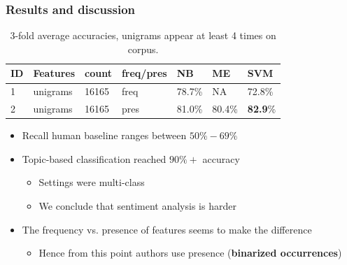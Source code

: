\documentclass{beamer}
\begin{document}
\begin{frame}
	\frametitle{Results and discussion}
	\begin{center}
		\begin{table}
			\begin{tabular}{l | l | l | l || l | l | l}
				ID & Features & count & freq/pres & NB & ME & SVM \\ \hline \hline
				1 & unigrams & 16165 & freq & 78.7\% & NA & 72.8\% \\
				2 & unigrams & 16165 & pres & 81.0\% & 80.4\% & \textbf{82.9}\% \\
			\end{tabular}
			\caption{3-fold average accuracies, unigrams appear at least 4 times on corpus.}
		\end{table}
	\end{center}
	\pause
	\begin{itemize}
		\item Recall human baseline ranges between $50\%-69\%$ \pause
		\item Topic-based classification reached $90\%+$ accuracy \pause
		\begin{itemize}
			\item Settings were multi-class
			\item We conclude that sentiment analysis is harder
		\end{itemize} \pause
		\item The frequency vs. presence of features seems to make the difference \pause
		\begin{itemize}
			\item Hence from this point authors use presence (\textbf{binarized occurrences})
		\end{itemize}
	\end{itemize}
\end{frame}
\end{document}
